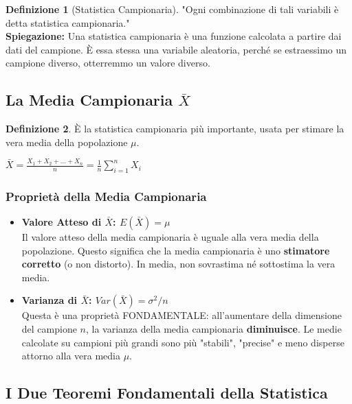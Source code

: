 \documentclass[a4paper, 11pt]{article}
\theoremstyle{definition}
\newtheorem{definizione}{Definizione}[section]
\begin{document}
\begin{definizione}[Statistica Campionaria]
"Ogni combinazione di tali variabili è detta statistica campionaria." \\
\textbf{Spiegazione:} Una statistica campionaria è una funzione calcolata a partire dai dati del campione. È essa stessa una variabile aleatoria, perché se estraessimo un campione diverso, otterremmo un valore diverso.
\end{definizione}

\subsection{La Media Campionaria $\bar{X}$}
\begin{definizione}
È la statistica campionaria più importante, usata per stimare la vera media della popolazione $\mu$.
\begin{formulabox}
    $\bar{X} = \frac{X_1 + X_2 + \dots + X_n}{n} = \frac{1}{n} \sum_{i=1}^{n} X_i$
\end{formulabox}
\end{definizione}

\subsubsection*{Proprietà della Media Campionaria}
\begin{itemize}
    \item \textbf{Valore Atteso di $\bar{X}$: $E(\bar{X}) = \mu$} \\
    Il valore atteso della media campionaria è uguale alla vera media della popolazione. Questo significa che la media campionaria è uno \textbf{stimatore corretto} (o non distorto). In media, non sovrastima né sottostima la vera media.

    \item \textbf{Varianza di $\bar{X}$: $Var(\bar{X}) = \sigma^2/n$} \\
    Questa è una proprietà FONDAMENTALE: all'aumentare della dimensione del campione $n$, la varianza della media campionaria \textbf{diminuisce}. Le medie calcolate su campioni più grandi sono più "stabili", "precise" e meno disperse attorno alla vera media $\mu$.
\end{itemize}

\subsection{I Due Teoremi Fondamentali della Statistica}
\end{document}
